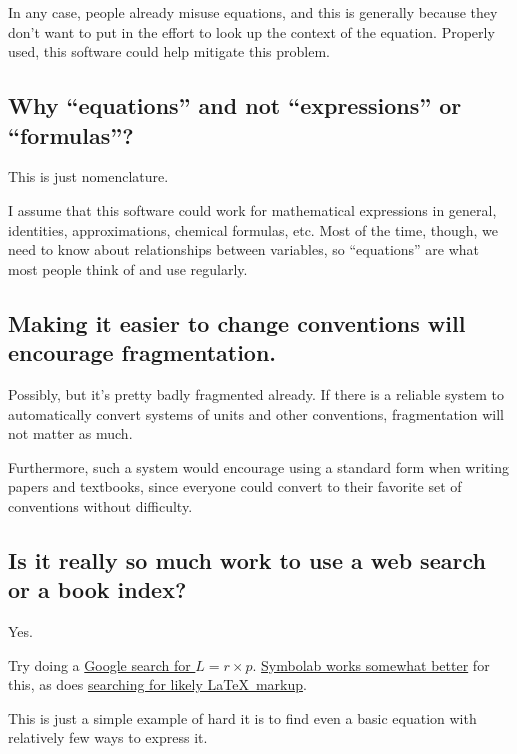 \documentclass[12pt,letterpaper]{article}
\begin{document}
In any case, people already misuse equations,
and this is generally because they don't want to put in the effort to look up the context of the equation.
Properly used, this software could help mitigate this problem.

\subsection{Why ``equations'' and not ``expressions'' or ``formulas''?}

This is just nomenclature.

I assume that this software could work for mathematical expressions in general,
identities, approximations, chemical formulas, etc.
Most of the time, though,
we need to know about relationships between variables,
so ``equations'' are what most people think of and use regularly.

\subsection{Making it easier to change conventions will encourage fragmentation.}

Possibly, but it's pretty badly fragmented already.
If there is a reliable system to automatically convert systems of units and other conventions,
fragmentation will not matter as much.

Furthermore,
such a system would encourage using a standard form when writing papers and textbooks,
since everyone could convert to their favorite set of conventions without difficulty.

\subsection{Is it really so much work to use a web search or a book index?}

Yes.

Try doing a
\href{https://www.google.com/search?q=%22L+%3D+r+%C3%97+P%22&oq=%22L+%3D+r+%C3%97+P%22}
{Google search for $L = r \times p$}.
\href{http://symbolab.com/search?origin=suggestion&query=L%3Dr%5Ctimes%20p}
{Symbolab works somewhat better} for this, as does
\href{https://www.google.com/search?&q=%22L+%3D+r+%5Ctimes+P%22&oq=%22L+%3D+r+%5Ctimes+P%22}
{searching for likely \LaTeX\ markup}.

This is just a simple example of hard it is to find even a basic equation with relatively few ways to express it.

\end{document}
